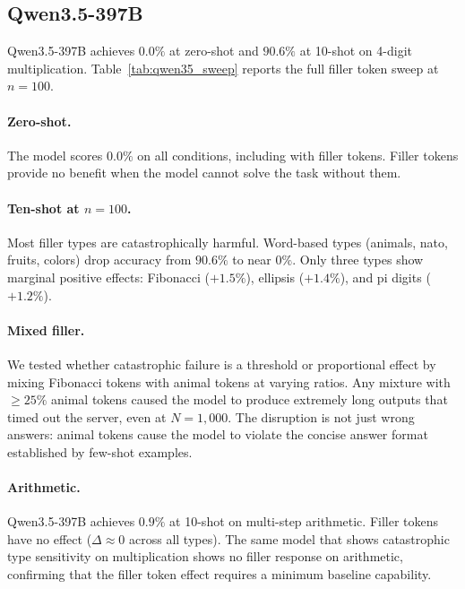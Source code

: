 \documentclass{article}
\begin{document}

\subsection{Qwen3.5-397B}
\label{app:qwen35_sweep}

Qwen3.5-397B achieves $0.0\%$ at zero-shot and $90.6\%$ at 10-shot on 4-digit multiplication. Table~\ref{tab:qwen35_sweep} reports the full filler token sweep at $n{=}100$.

\paragraph{Zero-shot.} The model scores $0.0\%$ on all conditions, including with filler tokens. Filler tokens provide no benefit when the model cannot solve the task without them.

\paragraph{Ten-shot at $n{=}100$.} Most filler types are catastrophically harmful. Word-based types (animals, nato, fruits, colors) drop accuracy from $90.6\%$ to near $0\%$. Only three types show marginal positive effects: Fibonacci ($+1.5\%$), ellipsis ($+1.4\%$), and pi digits ($+1.2\%$).

\paragraph{Mixed filler.} We tested whether catastrophic failure is a threshold or proportional effect by mixing Fibonacci tokens with animal tokens at varying ratios. Any mixture with $\geq 25\%$ animal tokens caused the model to produce extremely long outputs that timed out the server, even at $N{=}1{,}000$. The disruption is not just wrong answers: animal tokens cause the model to violate the concise answer format established by few-shot examples.

\paragraph{Arithmetic.} Qwen3.5-397B achieves $0.9\%$ at 10-shot on multi-step arithmetic. Filler tokens have no effect ($\Delta \approx 0$ across all types). The same model that shows catastrophic type sensitivity on multiplication shows no filler response on arithmetic, confirming that the filler token effect requires a minimum baseline capability.
\end{document}
